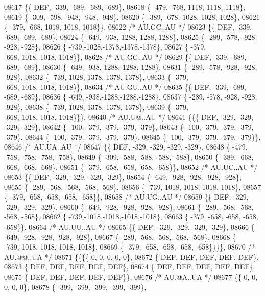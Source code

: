 \begin{DoxyCode}
08617 \{\{  DEF, -339, -689, -689, -689\},
08618 \{ -479, -768,-1118,-1118,-1118\},
08619 \{ -309, -598, -948, -948, -948\},
08620 \{ -389, -678,-1028,-1028,-1028\},
08621 \{ -379, -668,-1018,-1018,-1018\}\},
08622 \textcolor{comment}{/* AU.GC..AU */}
08623 \{\{  DEF, -339, -689, -689, -689\},
08624 \{ -649, -938,-1288,-1288,-1288\},
08625 \{ -289, -578, -928, -928, -928\},
08626 \{ -739,-1028,-1378,-1378,-1378\},
08627 \{ -379, -668,-1018,-1018,-1018\}\},
08628 \textcolor{comment}{/* AU.GG..AU */}
08629 \{\{  DEF, -339, -689, -689, -689\},
08630 \{ -649, -938,-1288,-1288,-1288\},
08631 \{ -289, -578, -928, -928, -928\},
08632 \{ -739,-1028,-1378,-1378,-1378\},
08633 \{ -379, -668,-1018,-1018,-1018\}\},
08634 \textcolor{comment}{/* AU.GU..AU */}
08635 \{\{  DEF, -339, -689, -689, -689\},
08636 \{ -649, -938,-1288,-1288,-1288\},
08637 \{ -289, -578, -928, -928, -928\},
08638 \{ -739,-1028,-1378,-1378,-1378\},
08639 \{ -379, -668,-1018,-1018,-1018\}\}\},
08640 \textcolor{comment}{/* AU.U@..AU */}
08641 \{\{\{  DEF, -329, -329, -329, -329\},
08642 \{ -100, -379, -379, -379, -379\},
08643 \{ -100, -379, -379, -379, -379\},
08644 \{ -100, -379, -379, -379, -379\},
08645 \{ -100, -379, -379, -379, -379\}\},
08646 \textcolor{comment}{/* AU.UA..AU */}
08647 \{\{  DEF, -329, -329, -329, -329\},
08648 \{ -479, -758, -758, -758, -758\},
08649 \{ -309, -588, -588, -588, -588\},
08650 \{ -389, -668, -668, -668, -668\},
08651 \{ -379, -658, -658, -658, -658\}\},
08652 \textcolor{comment}{/* AU.UC..AU */}
08653 \{\{  DEF, -329, -329, -329, -329\},
08654 \{ -649, -928, -928, -928, -928\},
08655 \{ -289, -568, -568, -568, -568\},
08656 \{ -739,-1018,-1018,-1018,-1018\},
08657 \{ -379, -658, -658, -658, -658\}\},
08658 \textcolor{comment}{/* AU.UG..AU */}
08659 \{\{  DEF, -329, -329, -329, -329\},
08660 \{ -649, -928, -928, -928, -928\},
08661 \{ -289, -568, -568, -568, -568\},
08662 \{ -739,-1018,-1018,-1018,-1018\},
08663 \{ -379, -658, -658, -658, -658\}\},
08664 \textcolor{comment}{/* AU.UU..AU */}
08665 \{\{  DEF, -329, -329, -329, -329\},
08666 \{ -649, -928, -928, -928, -928\},
08667 \{ -289, -568, -568, -568, -568\},
08668 \{ -739,-1018,-1018,-1018,-1018\},
08669 \{ -379, -658, -658, -658, -658\}\}\}\},
08670 \textcolor{comment}{/* AU.@@..UA */}
08671 \{\{\{\{    0,    0,    0,    0,    0\},
08672 \{  DEF,  DEF,  DEF,  DEF,  DEF\},
08673 \{  DEF,  DEF,  DEF,  DEF,  DEF\},
08674 \{  DEF,  DEF,  DEF,  DEF,  DEF\},
08675 \{  DEF,  DEF,  DEF,  DEF,  DEF\}\},
08676 \textcolor{comment}{/* AU.@A..UA */}
08677 \{\{    0,    0,    0,    0,    0\},
08678 \{ -399, -399, -399, -399, -399\},

\end{DoxyCode}
